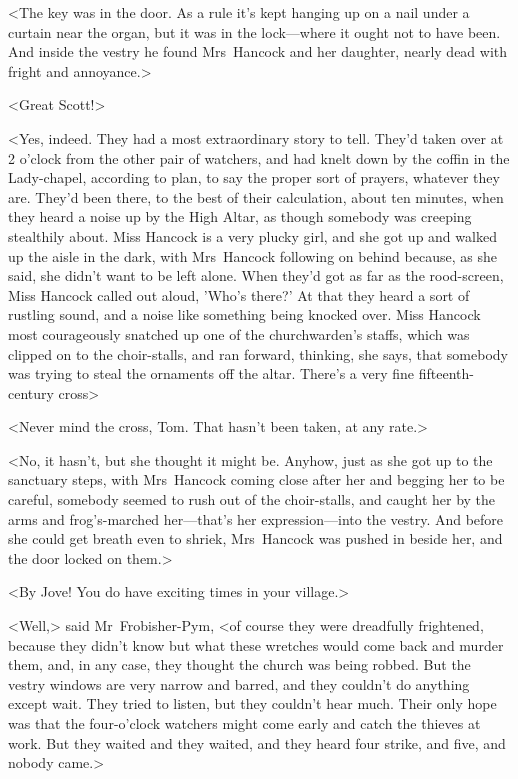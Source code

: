 <The key was in the door. As a rule it's kept hanging up on a nail under a curtain near the organ, but it was in the lock—where it ought not to have been. And inside the vestry he found Mrs~Hancock and her daughter, nearly dead with fright and annoyance.>

<Great Scott!>

<Yes, indeed. They had a most extraordinary story to tell. They'd taken over at 2 o'clock from the other pair of watchers, and had knelt down by the coffin in the Lady-chapel, according to plan, to say the proper sort of prayers, whatever they are. They'd been there, to the best of their calculation, about ten minutes, when they heard a noise up by the High Altar, as though somebody was creeping stealthily about. Miss Hancock is a very plucky girl, and she got up and walked up the aisle in the dark, with Mrs~Hancock following on behind because, as she said, she didn't want to be left alone. When they'd got as far as the rood-screen, Miss Hancock called out aloud, 'Who's there?' At that they heard a sort of rustling sound, and a noise like something being knocked over. Miss Hancock most courageously snatched up one of the churchwarden's staffs, which was clipped on to the choir-stalls, and ran forward, thinking, she says, that somebody was trying to steal the ornaments off the altar. There's a very fine fifteenth-century cross\longdash>

<Never mind the cross, Tom. That hasn't been taken, at any rate.>

<No, it hasn't, but she thought it might be. Anyhow, just as she got up to the sanctuary steps, with Mrs~Hancock coming close after her and begging her to be careful, somebody seemed to rush out of the choir-stalls, and caught her by the arms and frog's-marched her—that's her expression—into the vestry. And before she could get breath even to shriek, Mrs~Hancock was pushed in beside her, and the door locked on them.>

<By Jove! You do have exciting times in your village.>

<Well,> said Mr~Frobisher-Pym, <of course they were dreadfully frightened, because they didn't know but what these wretches would come back and murder them, and, in any case, they thought the church was being robbed. But the vestry windows are very narrow and barred, and they couldn't do anything except wait. They tried to listen, but they couldn't hear much. Their only hope was that the four-o'clock watchers might come early and catch the thieves at work. But they waited and they waited, and they heard four strike, and five, and nobody came.>

